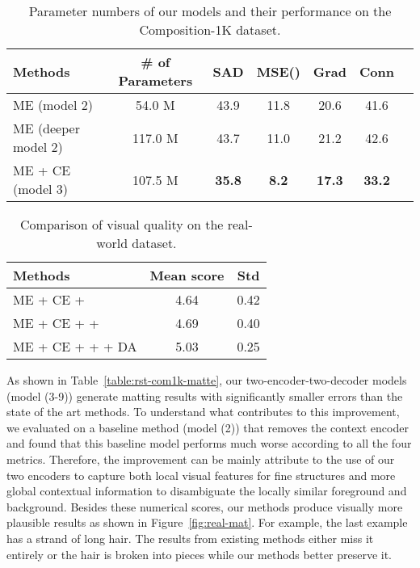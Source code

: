 \documentclass[10pt,twocolumn,letterpaper]{article}
\begin{document}
\begin{table}[t]
\setlength{\tabcolsep}{3pt}
	\caption{ Parameter numbers of our models and their performance on the Composition-1K dataset.}
	\footnotesize
	\label{table:rst-param-com1k-matte}
\begin{tabular}{lcccccc}
			\hline
			\multicolumn{1}{m{25mm}}{Methods}& \# of Parameters & SAD & MSE() &Grad & Conn \\ 
			\hline
			\multicolumn{1}{m{25mm}}{ME (model 2)} & 54.0 M &43.9 &11.8 &20.6 &41.6 \\
			\multicolumn{1}{m{25mm}}{ME (deeper model 2)}& 117.0 M & 43.7  &11.0 &21.2    &42.6 \\
			\multicolumn{1}{m{25mm}}{ME + CE (model 3) }& 107.5 M & \textbf{35.8}  &\textbf{8.2} &\textbf{17.3}  &\textbf{33.2} \\
			\hline
	\end{tabular}
\end{table}

\begin{table}[t]
	\centering
	\caption{Comparison of visual quality on the real-world dataset.}
\label{tbl:nima}
\begin{tabular}{lcc}
			\hline
			\multicolumn{1}{m{40mm}}{Methods} &Mean score &Std \\ 
			\hline
\multicolumn{1}{m{40mm}}{ME + CE + } &4.64 &0.42\\
			\multicolumn{1}{m{40mm}}{ME + CE +  +  } &4.69 &0.40\\
			\multicolumn{1}{m{40mm}}{ME + CE +  +  + DA} &5.03 &0.25\\
			\hline
	\end{tabular}\vspace{-0.25in}
\end{table}



As shown in Table~\ref{table:rst-com1k-matte}, our two-encoder-two-decoder models (model (3-9)) generate matting results with significantly smaller errors than the state of the art methods. To understand what contributes to this improvement, we evaluated on a baseline method (model (2)) that removes the context encoder and found that this baseline model performs much worse according to all the four metrics. Therefore, the improvement can be mainly attribute to the use of our two encoders to capture both local visual features for fine structures and more global contextual information to disambiguate the locally similar foreground and background. Besides these numerical scores, our methods produce visually more plausible results as shown in Figure~\ref{fig:real-mat}. For example, the last example has a strand of long hair. The results from existing methods either miss it entirely or the hair is broken into pieces while our methods better preserve it. 
\end{document}
